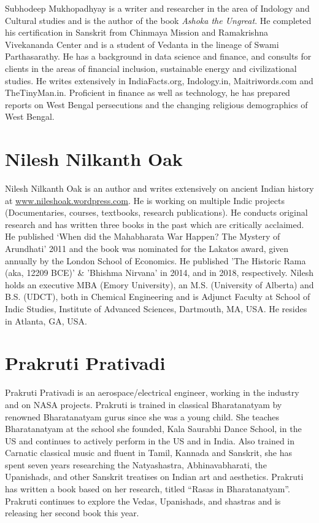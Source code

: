 Subhodeep Mukhopadhyay is a writer and researcher in the area of Indology and Cultural studies and is the author of the book \textit{Ashoka the Ungreat}. He completed his certification in Sanskrit from Chinmaya Mission and Ramakrishna Vivekananda Center and is a student of Vedanta in the lineage of Swami Parthasarathy. He has a background in data science and finance, and consults for clients in the areas of financial inclusion, sustainable energy and civilizational studies. He writes extensively in IndiaFacts.org, Indology.in, Maitriwords.com and TheTinyMan.in. Proficient in finance as well as technology, he has prepared reports on West Bengal persecutions and the changing religious demographics of West Bengal. 

\section*{Nilesh Nilkanth Oak}

Nilesh Nilkanth Oak is an author and writes extensively on ancient Indian history at \url{www.nileshoak.wordpress.com}. He is working on multiple Indic projects (Documentaries, courses, textbooks, research publications). He conducts original research and has written three books in the past which are critically acclaimed. He published ‘When did the Mahabharata War Happen? The Mystery of Arundhati’ 2011 and the book was nominated for the Lakatos award, given annually by the London School of Economics. He published 'The Historic Rama (aka, 12209 BCE)' \& 'Bhishma Nirvana' in 2014, and in 2018, respectively. Nilesh holds an executive MBA (Emory University), an M.S. (University of Alberta) and B.S. (UDCT), both in Chemical Engineering and is Adjunct Faculty at School of Indic Studies, Institute of Advanced Sciences, Dartmouth, MA, USA. He resides in Atlanta, GA, USA.

\section*{Prakruti Prativadi}

Prakruti Prativadi is an aerospace/electrical engineer, working in the industry and on NASA projects. Prakruti is trained in classical Bharatanatyam by renowned Bharatanatyam gurus since she was a young child. She teaches Bharatanatyam at the school she founded, Kala Saurabhi Dance School, in the US and continues to actively perform in the US and in India. Also trained in Carnatic classical music and fluent in Tamil, Kannada and Sanskrit, she has spent seven years researching the Natyashastra, Abhinavabharati, the Upanishads, and other Sanskrit treatises on Indian art and aesthetics. Prakruti has written a book based on her research, titled “Rasas in Bharatanatyam”. Prakruti continues to explore the Vedas, Upanishads, and shastras and is releasing her second book this year.

